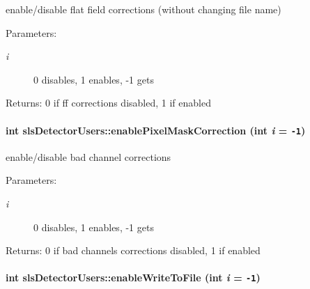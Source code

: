 enable/disable flat field corrections (without changing file name) 

\begin{Desc}
\item[Parameters:]
\begin{description}
\item[{\em i}]0 disables, 1 enables, -1 gets \end{description}
\end{Desc}
\begin{Desc}
\item[Returns:]0 if ff corrections disabled, 1 if enabled \end{Desc}
\hypertarget{classslsDetectorUsers_e5bc1c9c8e7e6cb7c9cde06a3133d263}{
\paragraph[enablePixelMaskCorrection]{\setlength{\rightskip}{0pt plus 5cm}int sls\-Detector\-Users::enable\-Pixel\-Mask\-Correction (int {\em i} = {\tt -1})}\hfill}
\label{classslsDetectorUsers_e5bc1c9c8e7e6cb7c9cde06a3133d263}


enable/disable bad channel corrections 

\begin{Desc}
\item[Parameters:]
\begin{description}
\item[{\em i}]0 disables, 1 enables, -1 gets \end{description}
\end{Desc}
\begin{Desc}
\item[Returns:]0 if bad channels corrections disabled, 1 if enabled \end{Desc}
\hypertarget{classslsDetectorUsers_6d54a79ae4cfdb808f5db9969537efd3}{
\paragraph[enableWriteToFile]{\setlength{\rightskip}{0pt plus 5cm}int sls\-Detector\-Users::enable\-Write\-To\-File (int {\em i} = {\tt -1})}\hfill}
\label{classslsDetectorUsers_6d54a79ae4cfdb808f5db9969537efd3}


